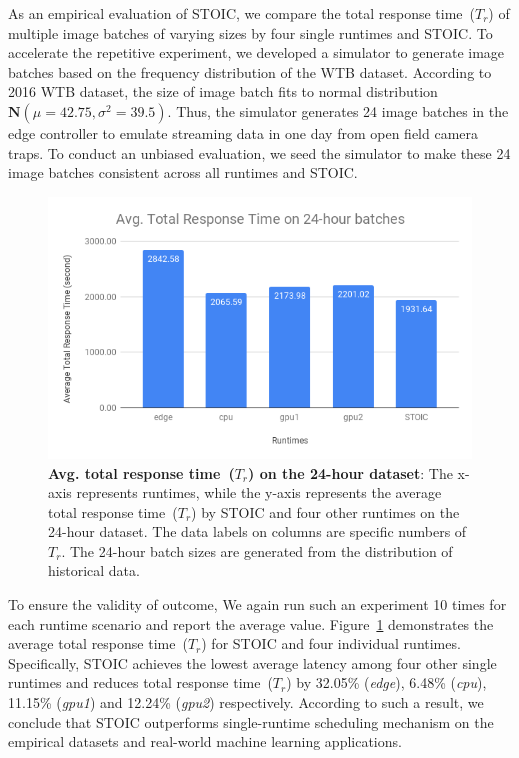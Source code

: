 %     


As an empirical evaluation of STOIC, we compare the total response time~($T_r$) of multiple image batches of varying sizes by four single runtimes and STOIC. To accelerate the repetitive experiment, we developed a simulator to generate image batches based on the frequency distribution of the WTB dataset. According to 2016 WTB dataset, the size of image batch fits to normal distribution $\mathbf{N}(\mu = 42.75, \sigma^2 = 39.5)$. Thus, the simulator generates 24 image batches in the edge controller to emulate streaming data in one day from open field camera traps. To conduct an unbiased evaluation, we seed the simulator to make these 24 image batches consistent across all runtimes and STOIC. 

\begin{figure}[t] \centering 
\includegraphics[scale=0.42]{figures/24-batches}
\caption{\textbf{Avg. total response time~($T_r$) on the 24-hour dataset}: The x-axis represents runtimes, while the y-axis represents the average total response time~($T_r$) by STOIC and four other runtimes on the 24-hour dataset. The data labels on columns are specific numbers of $T_r$. The 24-hour batch sizes are generated from the distribution of historical data. 
\label{fig:24-batch}}
\end{figure}

To ensure the validity of outcome, We again run such an experiment 10 times for each runtime scenario and report the average value. Figure~\ref{fig:24-batch} demonstrates the average total response time~($T_r$) for STOIC and four individual runtimes. Specifically, STOIC achieves the lowest average latency among four other single runtimes and reduces total response time~($T_r$) by 32.05\% (\textit{edge}), 6.48\% (\textit{cpu}), 11.15\% (\textit{gpu1}) and 12.24\% (\textit{gpu2}) respectively. According to such a result, we conclude that STOIC outperforms single-runtime scheduling mechanism on the empirical datasets and real-world machine learning applications.
